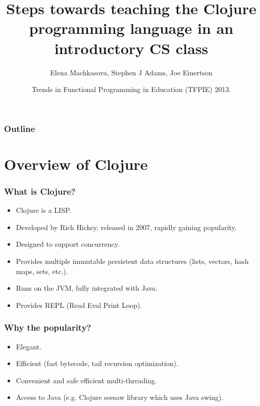 \documentclass{beamer}
\newcommand{\allcomments}[1]{{#1}}
\newcommand{\joecomment}[1]{{\bf \color{JoesGold}{\allcomments{{#1}}}}}
\begin{document}
\title{Steps towards teaching the Clojure programming language in an introductory CS  class}
\author{Elena Machkasova, Stephen J Adams, Joe Einertson}
\date[May 13, 2013]  
{Trends in Functional Programming in Education (TFPIE) 2013.}

\begin{frame}
  \titlepage
\end{frame}

\begin{frame}

  \frametitle{Outline}
\tableofcontents
\end{frame}

\section{Overview of Clojure}

\begin{frame}
\frametitle{What is Clojure?}
\begin{itemize}
\item Clojure is a LISP.
\item Developed by Rich Hickey, released in 2007, rapidly gaining popularity. 
\item Designed to support concurrency. %
\item Provides multiple immutable persistent data structures (lists, vectors, hash maps, sets, etc.).
\item Runs on the JVM, fully integrated with Java. 
\item Provides REPL (Read Eval Print Loop).
\end{itemize}
\end{frame}

\begin{frame}
\frametitle{Why the popularity?}
\begin{itemize}
\item Elegant.
\item Efficient (fast bytecode, tail recursion optimization).
\item Convenient and safe efficient multi-threading. 
\item Access to Java (e.g. Clojure seesaw library which uses Java swing). 
\end{itemize}
\end{frame}
\end{document}
